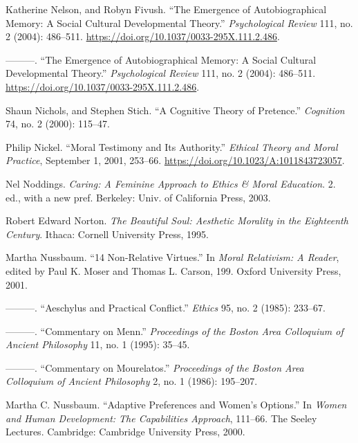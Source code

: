 \documentclass[phdthesis,12pt,final,a4paper]{wuthesis}
\newlength{\cslhangindent}
\newenvironment{CSLReferences}[2] %
{\begin{list}{}{%
	\setlength{\itemindent}{0pt}
	\setlength{\leftmargin}{0pt}
	\setlength{\parsep}{0pt}
	\ifodd #1
	\setlength{\leftmargin}{\cslhangindent}
	\setlength{\itemindent}{-1\cslhangindent}
	\fi
	\setlength{\itemsep}{#2\baselineskip}}}
{\end{list}}
\theoremstyle{definition}
\theoremstyle{definition}
\theoremstyle{definition}
\theoremstyle{definition}
\theoremstyle{remark}
\begin{document}
\begin{CSLReferences}{1}{0}
Katherine Nelson, and Robyn Fivush. {``The {Emergence} of {Autobiographical Memory}: {A Social Cultural Developmental Theory}.''} \emph{Psychological Review} 111, no. 2 (2004): 486--511. \url{https://doi.org/10.1037/0033-295X.111.2.486}.

---------. {``The {Emergence} of {Autobiographical Memory}: {A Social Cultural Developmental Theory}.''} \emph{Psychological Review} 111, no. 2 (2004): 486--511. \url{https://doi.org/10.1037/0033-295X.111.2.486}.

Shaun Nichols, and Stephen Stich. {``A {Cognitive Theory} of {Pretence}.''} \emph{Cognition} 74, no. 2 (2000): 115--47.

Philip Nickel. {``Moral {Testimony} and Its {Authority}.''} \emph{Ethical Theory and Moral Practice}, September 1, 2001, 253--66. \url{https://doi.org/10.1023/A:1011843723057}.

Nel Noddings. \emph{Caring: A Feminine Approach to Ethics \& Moral Education}. 2. ed., with a new pref. Berkeley: Univ. of California Press, 2003.

Robert Edward Norton. \emph{The Beautiful Soul: Aesthetic Morality in the Eighteenth Century}. Ithaca: Cornell University Press, 1995.

Martha Nussbaum. {``14 {Non-Relative Virtues}.''} In \emph{Moral {Relativism}: {A Reader}}, edited by Paul K. Moser and Thomas L. Carson, 199. Oxford University Press, 2001.

---------. {``Aeschylus and Practical Conflict.''} \emph{Ethics} 95, no. 2 (1985): 233--67.

---------. {``Commentary on {Menn}.''} \emph{Proceedings of the Boston Area Colloquium of Ancient Philosophy} 11, no. 1 (1995): 35--45.

---------. {``Commentary on {Mourelatos}.''} \emph{Proceedings of the Boston Area Colloquium of Ancient Philosophy} 2, no. 1 (1986): 195--207.

Martha C. Nussbaum. {``Adaptive {Preferences} and {Women}'s {Options}.''} In \emph{Women and Human Development: {The} Capabilities Approach}, 111--66. The Seeley Lectures. Cambridge: Cambridge University Press, 2000.


\end{CSLReferences}
\end{document}
